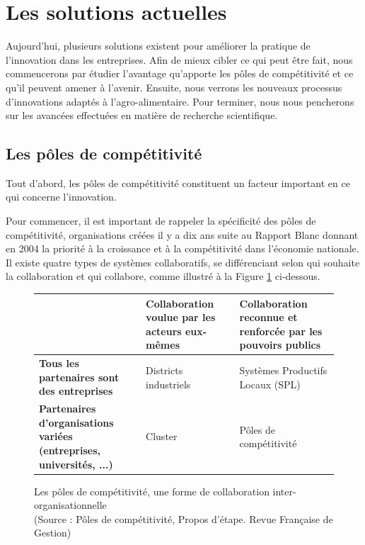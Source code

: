 \documentclass[a4paper,12pt]{report}
\begin{document}
	\section{Les solutions actuelles}
		Aujourd’hui, plusieurs solutions existent pour améliorer la pratique de l’innovation dans les entreprises. Afin de mieux cibler ce qui peut être fait, nous commencerons par étudier l’avantage qu’apporte les pôles de compétitivité et ce qu’il peuvent amener à l’avenir. Ensuite, nous verrons les nouveaux processus d’innovations adaptés à l’agro-alimentaire. Pour terminer, nous nous pencherons sur les avancées effectuées en matière de recherche scientifique.
		
		\subsection{Les pôles de compétitivité}
		Tout d’abord, les pôles de compétitivité constituent un facteur important en ce qui concerne l’innovation.
		
		Pour commencer, il est important de rappeler la spécificité des pôles de compétitivité, organisations créées il y a dix ans suite au Rapport Blanc donnant en 2004 la priorité à la croissance et à la compétitivité dans l’économie nationale\cite{RapportBlanc}. Il existe quatre types de systèmes collaboratifs, se différenciant selon qui souhaite la collaboration et qui collabore, comme illustré à la Figure  \ref{ComparaisonSystemesCollaboratifs} ci-dessous.
	
		\begin{figure}[!h]		
		
		\vspace{11pt}
		\begin{center}
		\begin{tabular}{|M{110pt}|M{100pt}|M{100pt}|}
			\hline
			& \textbf{Collaboration voulue par les acteurs eux-mêmes} & \textbf{Collaboration reconnue et renforcée par les pouvoirs publics}\\
			\hline
			\textbf{Tous les partenaires sont des entreprises} & Districts industriels & Systèmes Productifs Locaux (SPL)\\
			\hline
			\textbf{Partenaires d'organisations variées (entreprises, universités, ...)} & Cluster & Pôles de compétitivité\\
			\hline
		\end{tabular}
		
		\caption{Les pôles de compétitivité, une forme de collaboration inter-organisationnelle \\(Source : Pôles de compétitivité, Propos d'étape. Revue Française de Gestion\cite{PoleCompetitivite})}
		
		\label{ComparaisonSystemesCollaboratifs}
		\end{center}
		\end{figure}
		
\end{document}
